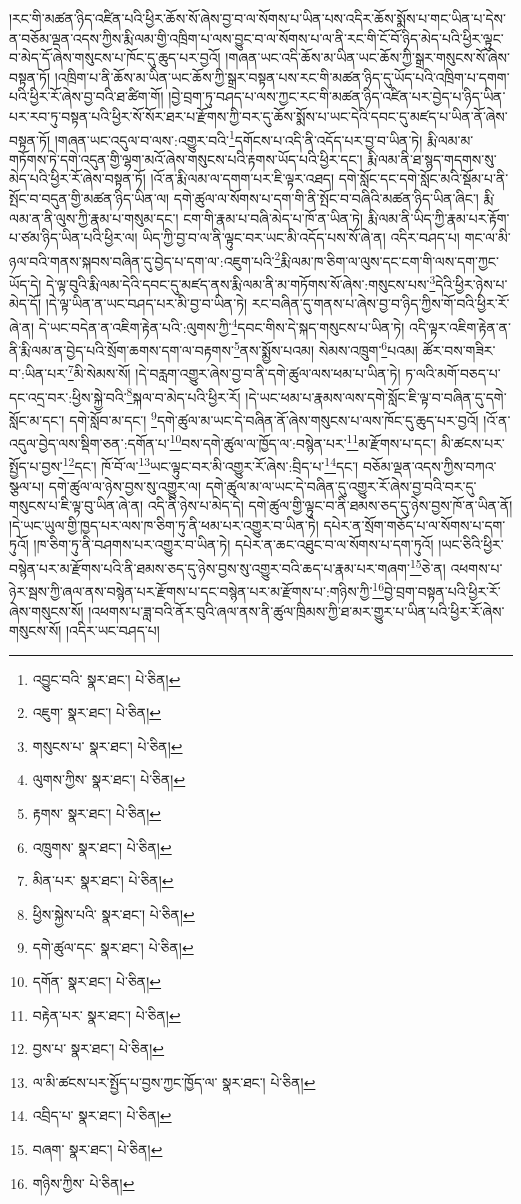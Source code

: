 །རང་གི་མཚན་ཉིད་འཛིན་པའི་ཕྱིར་ཆོས་སོ་ཞེས་བྱ་བ་ལ་སོགས་པ་ཡིན་པས་འདིར་ཆོས་སྨོས་པ་གང་ཡིན་པ་དེས་ན་བཅོམ་ལྡན་འདས་ཀྱིས་རྨི་ལམ་གྱི་འཁྲིག་པ་ལས་བྱུང་བ་ལ་སོགས་པ་ལ་ནི་རང་གི་ངོ་བོ་ཉིད་མེད་པའི་ཕྱིར་ལྟུང་བ་མེད་དོ་ཞེས་གསུངས་པ་ཁོང་དུ་ཆུད་པར་བྱའོ། །གཞན་ཡང་འདི་ཆོས་མ་ཡིན་ཡང་ཆོས་ཀྱི་སྒྲར་གསུངས་སོ་ཞེས་བསྟན་ཏོ། །འཁྲིག་པ་ནི་ཆོས་མ་ཡིན་ཡང་ཆོས་ཀྱི་སྒྲར་བསྟན་པས་རང་གི་མཚན་ཉིད་དུ་ཡོད་པའི་འཁྲིག་པ་དགག་པའི་ཕྱིར་རོ་ཞེས་བྱ་བའི་ཐ་ཚིག་གོ། །བྱེ་བྲག་ཏུ་བཤད་པ་ལས་ཀྱང་རང་གི་མཚན་ཉིད་འཛིན་པར་བྱེད་པ་ཉིད་ཡིན་པར་རབ་ཏུ་བསྟན་པའི་ཕྱིར་སོ་སོར་ཐར་པ་རྫོགས་ཀྱི་བར་དུ་ཆོས་སྨོས་པ་ཡང་དེའི་དབང་དུ་མཛད་པ་ཡིན་ནོ་ཞེས་བསྟན་ཏོ། །གཞན་ཡང་འདུལ་བ་ལས་:འགྱུར་བའི་\footnote{འབྱུང་བའི་  སྣར་ཐང་།  པེ་ཅིན། }དགོངས་པ་འདི་ནི་འདོད་པར་བྱ་བ་ཡིན་ཏེ། རྨི་ལམ་མ་གཏོགས་ཏེ་དགེ་འདུན་གྱི་ལྷག་མའོ་ཞེས་གསུངས་པའི་རྟགས་ཡོད་པའི་ཕྱིར་དང་། རྨི་ལམ་ནི་ཐ་སྙད་གདགས་སུ་མེད་པའི་ཕྱིར་རོ་ཞེས་བསྟན་ཏོ། །འོ་ན་རྨི་ལམ་ལ་དགག་པར་ཇི་ལྟར་འཐད། དགེ་སློང་དང་དགེ་སློང་མའི་སྡོམ་པ་ནི་སྤོང་བ་བདུན་གྱི་མཚན་ཉིད་ཡིན་ལ། དགེ་ཚུལ་ལ་སོགས་པ་དག་གི་ནི་སྤོང་བ་བཞིའི་མཚན་ཉིད་ཡིན་ཞིང་། རྨི་ལམ་ན་ནི་ལུས་ཀྱི་རྣམ་པ་གསུམ་དང་། ངག་གི་རྣམ་པ་བཞི་མེད་པ་ཁོ་ན་ཡིན་ཏེ། རྨི་ལམ་ནི་ཡིད་ཀྱི་རྣམ་པར་རྟོག་པ་ཙམ་ཉིད་ཡིན་པའི་ཕྱིར་ལ། ཡིད་ཀྱི་བྱ་བ་ལ་ནི་ལྟུང་བར་ཡང་མི་འདོད་པས་སོ་ཞེ་ན། འདིར་བཤད་པ། གང་ལ་མི་ཉལ་བའི་གནས་སྐབས་བཞིན་དུ་བྱེད་པ་དག་ལ་:འཇུག་པའི་\footnote{འཇུག་  སྣར་ཐང་།  པེ་ཅིན། }རྨི་ལམ་ཁ་ཅིག་ལ་ལུས་དང་ངག་གི་ལས་དག་ཀྱང་ཡོད་དེ། དེ་ལྟ་བུའི་རྨི་ལམ་དེའི་དབང་དུ་མཛད་ནས་རྨི་ལམ་ནི་མ་གཏོགས་སོ་ཞེས་:གསུངས་པས་\footnote{གསུངས་པ་  སྣར་ཐང་།  པེ་ཅིན། }དེའི་ཕྱིར་ཉེས་པ་མེད་དོ། །དེ་ལྟ་ཡིན་ན་ཡང་བཤད་པར་མི་བྱ་བ་ཡིན་ཏེ། རང་བཞིན་དུ་གནས་པ་ཞེས་བྱ་བ་ཉིད་ཀྱིས་གོ་བའི་ཕྱིར་རོ་ཞེ་ན། དེ་ཡང་བདེན་ན་འཇིག་རྟེན་པའི་:ལུགས་ཀྱི་\footnote{ལུགས་ཀྱིས་  སྣར་ཐང་།  པེ་ཅིན། }དབང་གིས་དེ་སྐད་གསུངས་པ་ཡིན་ཏེ། འདི་ལྟར་འཇིག་རྟེན་ན་ནི་རྨི་ལམ་ན་བྱེད་པའི་སྲོག་ཆགས་དག་ལ་བརྟགས་\footnote{རྟགས་  སྣར་ཐང་།  པེ་ཅིན། }ནས་སྨྱོས་པའམ། སེམས་འཁྲུག་\footnote{འཁྲུགས་  སྣར་ཐང་།  པེ་ཅིན། }པའམ། ཚོར་བས་གཟིར་བ་:ཡིན་པར་\footnote{མིན་པར་  སྣར་ཐང་།  པེ་ཅིན། }མི་སེམས་སོ། །དེ་བརླག་འགྱུར་ཞེས་བྱ་བ་ནི་དགེ་ཚུལ་ལས་ཕམ་པ་ཡིན་ཏེ། ཏ་ལའི་མགོ་བཅད་པ་དང་འདྲ་བར་:ཕྱིས་སྐྱེ་བའི་\footnote{ཕྱིས་སྐྱེས་པའི་  སྣར་ཐང་།  པེ་ཅིན། }སྐལ་བ་མེད་པའི་ཕྱིར་རོ། །དེ་ཡང་ཕམ་པ་རྣམས་ལས་དགེ་སློང་ཇི་ལྟ་བ་བཞིན་དུ་དགེ་སློང་མ་དང་། དགེ་སློབ་མ་དང་། \footnote{དགེ་ཚུལ་དང་  སྣར་ཐང་།  པེ་ཅིན། }དགེ་ཚུལ་མ་ཡང་དེ་བཞིན་ནོ་ཞེས་གསུངས་པ་ལས་ཁོང་དུ་ཆུད་པར་བྱའོ། །འོ་ན་འདུལ་བྱེད་ལས་སྡིག་ཅན་:དགོན་པ་\footnote{དགོན་  སྣར་ཐང་།  པེ་ཅིན། }བས་དགེ་ཚུལ་ལ་ཁྱོད་ལ་:བསྙེན་པར་\footnote{བརྟེན་པར་  སྣར་ཐང་།  པེ་ཅིན། }མ་རྫོགས་པ་དང་། མི་ཚངས་པར་སྤྱོད་པ་བྱས་\footnote{བྱས་པ་  སྣར་ཐང་།  པེ་ཅིན། }དང་། ཁོ་བོ་ལ་\footnote{ལ་མི་ཚངས་པར་སྤྱོད་པ་བྱས་ཀྱང་ཁྱོད་ལ་  སྣར་ཐང་།  པེ་ཅིན། }ཡང་ལྟུང་བར་མི་འགྱུར་རོ་ཞེས་:བྲིད་པ་\footnote{འབྲིད་པ་  སྣར་ཐང་།  པེ་ཅིན། }དང་། བཅོམ་ལྡན་འདས་ཀྱིས་བཀའ་སྩལ་པ། དགེ་ཚུལ་ལ་ཉེས་བྱས་སུ་འགྱུར་ལ། དགེ་ཚུལ་མ་ལ་ཡང་དེ་བཞིན་དུ་འགྱུར་རོ་ཞེས་བྱ་བའི་བར་དུ་གསུངས་པ་ཇི་ལྟ་བུ་ཡིན་ཞེ་ན། འདི་ནི་ཉེས་པ་མེད་དེ། དགེ་ཚུལ་གྱི་ལྟུང་བ་ནི་ཐམས་ཅད་དུ་ཉེས་བྱས་ཁོ་ན་ཡིན་ནོ། །དེ་ཡང་ཡུལ་གྱི་ཁྱད་པར་ལས་ཁ་ཅིག་ཏུ་ནི་ཕམ་པར་འགྱུར་བ་ཡིན་ཏེ། དཔེར་ན་སྲོག་གཅོད་པ་ལ་སོགས་པ་དག་ཏུའོ། །ཁ་ཅིག་ཏུ་ནི་བཤགས་པར་འགྱུར་བ་ཡིན་ཏེ། དཔེར་ན་ཆང་འཐུང་བ་ལ་སོགས་པ་དག་ཏུའོ། །ཡང་ཅིའི་ཕྱིར་བསྙེན་པར་མ་རྫོགས་པའི་ནི་ཐམས་ཅད་དུ་ཉེས་བྱས་སུ་འགྱུར་བའི་ཆད་པ་རྣམ་པར་གཞག་\footnote{བཞག་  སྣར་ཐང་།  པེ་ཅིན། }ཅེ་ན། འཕགས་པ་ཉེར་སྦས་ཀྱི་ཞལ་ནས་བསྙེན་པར་རྫོགས་པ་དང་བསྙེན་པར་མ་རྫོགས་པ་:གཉིས་ཀྱི་\footnote{གཉིས་ཀྱིས་  པེ་ཅིན། }བྱེ་བྲག་བསྟན་པའི་ཕྱིར་རོ་ཞེས་གསུངས་སོ། །འཕགས་པ་ཟླ་བའི་ནོར་བུའི་ཞལ་ནས་ནི་ཚུལ་ཁྲིམས་ཀྱི་ཐ་མར་གྱུར་པ་ཡིན་པའི་ཕྱིར་རོ་ཞེས་གསུངས་སོ། །འདིར་ཡང་བཤད་པ། 